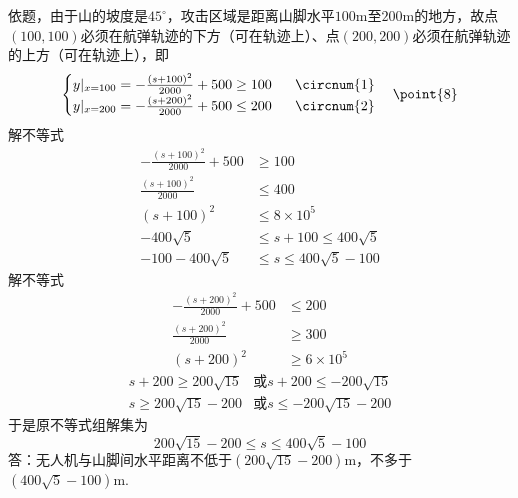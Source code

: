 \documentclass[10pt]{article}
\begin{document}
\begin{questions}{\answeringintroduction}
\begin{subquestions}
        依题，由于山的坡度是$45^{\circ}$，攻击区域是距离山脚水平$100$m至$200$m的地方，故点$(100,100)$必须在航弹轨迹的下方（可在轨迹上）、点$(200,200)$必须在航弹轨迹的上方（可在轨迹上），即
        $$\begin{cases}
            y|_{x=100} = -\frac{(s+100)^2}{2000}+500 \geq 100 \ \ \ \ \ \text{\circnum{1}} \\
            y|_{x=200} = -\frac{(s+200)^2}{2000}+500 \leq 200 \ \ \ \ \ \text{\circnum{2}}
        \end{cases} \point{8} $$
        解不等式
        $$\begin{aligned}
            -\frac{(s+100)^2}{2000}+500 & \geq 100 \\
            \frac{(s+100)^2}{2000} & \leq 400 \\
            (s+100)^2 & \leq 8 \times 10^5 \\
            -400\sqrt{5} &\leq s + 100 \leq 400\sqrt{5} \\
            -100-400\sqrt{5} &\leq s \leq 400\sqrt{5}-100
        \end{aligned}$$
        解不等式
        $$\begin{aligned}
            -\frac{(s+200)^2}{2000}+500 & \leq 200 \\
            \frac{(s+200)^2}{2000} & \geq 300 \\
            (s+200)^2 & \geq 6 \times 10^5
        \end{aligned}$$
        $$\begin{aligned}
            s+200 \geq 200\sqrt{15} &或 s+200 \leq -200\sqrt{15} \\
            s \geq 200\sqrt{15}-200 &或 s \leq -200\sqrt{15}-200
        \end{aligned}$$
        于是原不等式组解集为
        $$200\sqrt{15}-200 \leq s \leq 400\sqrt{5}-100$$
        答：无人机与山脚间水平距离不低于$(200\sqrt{15}-200)$m，不多于$(400\sqrt{5}-100)$m.
        \begin{figure}[!htb]
            \raggedleft
\end{figure}
\end{subquestions}
\end{questions}
\end{document}
